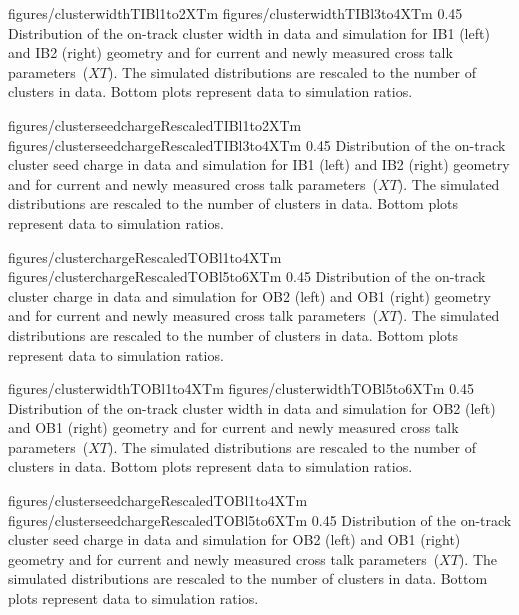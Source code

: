                  {figures/clusterwidthTIBl1to2XTm}
                 {figures/clusterwidthTIBl3to4XTm}
                 {0.45}       %
                 { Distribution of the on-track cluster width in data and simulation for IB1 (left) and IB2 (right) geometry and for current and newly measured cross talk parameters~($XT$).  The simulated distributions are rescaled to the number of clusters in data.  Bottom plots represent data to simulation ratios. }

                 {figures/clusterseedchargeRescaledTIBl1to2XTm} %
                 {figures/clusterseedchargeRescaledTIBl3to4XTm} %
                 {0.45}       %
                 { Distribution of the on-track cluster seed charge in data and simulation for IB1 (left) and IB2 (right) geometry and for current and newly measured cross talk parameters~($XT$).  The simulated distributions are rescaled to the number of clusters in data.  Bottom plots represent data to simulation ratios. }


                 {figures/clusterchargeRescaledTOBl1to4XTm} %
                 {figures/clusterchargeRescaledTOBl5to6XTm} %
                 {0.45}       %
                 { Distribution of the on-track cluster charge in data and simulation for OB2 (left) and OB1 (right) geometry and for current and newly measured cross talk parameters~($XT$).  The simulated distributions are rescaled to the number of clusters in data.  Bottom plots represent data to simulation ratios. }

                 {figures/clusterwidthTOBl1to4XTm}
                 {figures/clusterwidthTOBl5to6XTm}
                 {0.45}       %
                 { Distribution of the on-track cluster width in data and simulation for OB2 (left) and OB1 (right) geometry and for current and newly measured cross talk parameters~($XT$).  The simulated distributions are rescaled to the number of clusters in data.  Bottom plots represent data to simulation ratios. }

                 {figures/clusterseedchargeRescaledTOBl1to4XTm} %
                 {figures/clusterseedchargeRescaledTOBl5to6XTm} %
                 {0.45}       %
                 { Distribution of the on-track cluster seed charge in data and simulation for OB2 (left) and OB1 (right) geometry and for current and newly measured cross talk parameters~($XT$).  The simulated distributions are rescaled to the number of clusters in data.  Bottom plots represent data to simulation ratios. }


